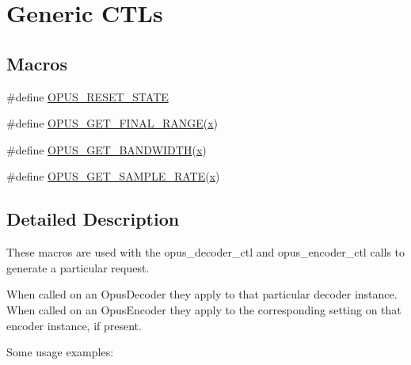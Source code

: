 \hypertarget{group__opus__genericctls}{}\section{Generic C\+T\+Ls}
\label{group__opus__genericctls}
\subsection*{Macros}
\begin{DoxyCompactItemize}
\item 
\#define \hyperlink{group__opus__genericctls_gadc74e4fa8bcdf9994187d52d92207337}{O\+P\+U\+S\+\_\+\+R\+E\+S\+E\+T\+\_\+\+S\+T\+A\+TE}
\item 
\#define \hyperlink{group__opus__genericctls_ga1108a508aa475f964d247c1b04d26d89}{O\+P\+U\+S\+\_\+\+G\+E\+T\+\_\+\+F\+I\+N\+A\+L\+\_\+\+R\+A\+N\+GE}(\hyperlink{fmaths_8inl_a7ba8ab2f1e8f362163e17da3f15a5db9}{x})
\item 
\#define \hyperlink{group__opus__genericctls_ga29db1d9b5e670debec54d1163ad2ec62}{O\+P\+U\+S\+\_\+\+G\+E\+T\+\_\+\+B\+A\+N\+D\+W\+I\+D\+TH}(\hyperlink{fmaths_8inl_a7ba8ab2f1e8f362163e17da3f15a5db9}{x})
\item 
\#define \hyperlink{group__opus__genericctls_gac8ad425424211faae6a0fbfb7c28bb51}{O\+P\+U\+S\+\_\+\+G\+E\+T\+\_\+\+S\+A\+M\+P\+L\+E\+\_\+\+R\+A\+TE}(\hyperlink{fmaths_8inl_a7ba8ab2f1e8f362163e17da3f15a5db9}{x})
\end{DoxyCompactItemize}


\subsection{Detailed Description}
These macros are used with the {\ttfamily opus\+\_\+decoder\+\_\+ctl} and {\ttfamily opus\+\_\+encoder\+\_\+ctl} calls to generate a particular request.

When called on an {\ttfamily Opus\+Decoder} they apply to that particular decoder instance. When called on an {\ttfamily Opus\+Encoder} they apply to the corresponding setting on that encoder instance, if present.

Some usage examples\+:



